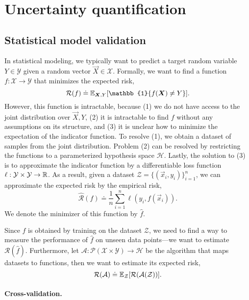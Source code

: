 \section{Uncertainty quantification}

\subsection{Statistical model validation}

In statistical modeling, we typically want to predict a target random variable $Y \in \mathcal{Y}$
given a random vector $\vec{X} \in \mathcal{X}$. Formally, we want to find a function $f:
    \mathcal{X} \to \mathcal{Y}$ that minimizes the expected risk, \[
    \mathcal{R}(f) \doteq \E_{\vec{X}, Y} [\mathbb{1}\{ f(\vec{X}) \neq Y \}].
\]
However, this function is intractable, because (1) we do not have access to the joint distribution
over $\vec{X}, Y$, (2) it is intractable to find $f$ without any assumptions on its structure, and
(3) it is unclear how to minimize the expectation of the indicator function. To resolve (1), we
obtain a dataset of samples from the joint distribution. Problem (2) can be resolved by restricting
the functions to a parameterized hypothesis space $\mathcal{H}$. Lastly, the solution to (3) is to
approximate the indicator function by a differentiable loss function $\ell: \mathcal{Y} \times
    \mathcal{Y} \to \mathbb{R}$. As a result, given a dataset $\mathcal{Z} = \{ (\vec{x}_i, y_i) \}_{i=1}^n$,
we can approximate the expected risk by the empirical risk, \[
    \hat{\mathcal{R}}(f) \doteq \frac{1}{n} \sum_{i=1}^{n} \ell(y_i, f(\vec{x}_i)).
\]
We denote the minimizer of this function by $\hat{f}$.

Since $\hat{f}$ is obtained by training on the dataset $\mathcal{Z}$, we need to find a way to
measure the performance of $\hat{f}$ on unseen data points---we want to estimate
$\mathcal{R}(\hat{f})$. Furthermore, let $\mathcal{A}: \mathcal{P}(\mathcal{X} \times \mathcal{Y})
    \to \mathcal{H}$ be the algorithm that maps datasets to functions, then we want to estimate its
expected risk, \[
    \mathcal{R}(\mathcal{A}) \doteq \mathbb{E}_{\mathcal{Z}} [\mathcal{R}(\mathcal{A}(\mathcal{Z}))].
\]

\paragraph{Cross-validation.}

